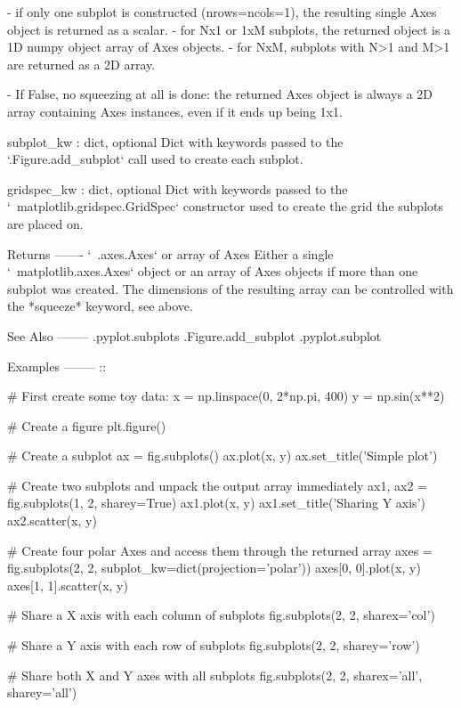 \begin{DoxyVerb}
\begin{DoxyVerb}
\begin{DoxyVerb}
      - if only one subplot is constructed (nrows=ncols=1), the
resulting single Axes object is returned as a scalar.
      - for Nx1 or 1xM subplots, the returned object is a 1D numpy
object array of Axes objects.
      - for NxM, subplots with N>1 and M>1 are returned as a 2D array.

    - If False, no squeezing at all is done: the returned Axes object
      is always a 2D array containing Axes instances, even if it ends
      up being 1x1.

subplot_kw : dict, optional
    Dict with keywords passed to the `.Figure.add_subplot` call used to
    create each subplot.

gridspec_kw : dict, optional
    Dict with keywords passed to the
    `~matplotlib.gridspec.GridSpec` constructor used to create
    the grid the subplots are placed on.

Returns
-------
`~.axes.Axes` or array of Axes
    Either a single `~matplotlib.axes.Axes` object or an array of Axes
    objects if more than one subplot was created. The dimensions of the
    resulting array can be controlled with the *squeeze* keyword, see
    above.

See Also
--------
.pyplot.subplots
.Figure.add_subplot
.pyplot.subplot

Examples
--------
::

    # First create some toy data:
    x = np.linspace(0, 2*np.pi, 400)
    y = np.sin(x**2)

    # Create a figure
    plt.figure()

    # Create a subplot
    ax = fig.subplots()
    ax.plot(x, y)
    ax.set_title('Simple plot')

    # Create two subplots and unpack the output array immediately
    ax1, ax2 = fig.subplots(1, 2, sharey=True)
    ax1.plot(x, y)
    ax1.set_title('Sharing Y axis')
    ax2.scatter(x, y)

    # Create four polar Axes and access them through the returned array
    axes = fig.subplots(2, 2, subplot_kw=dict(projection='polar'))
    axes[0, 0].plot(x, y)
    axes[1, 1].scatter(x, y)

    # Share a X axis with each column of subplots
    fig.subplots(2, 2, sharex='col')

    # Share a Y axis with each row of subplots
    fig.subplots(2, 2, sharey='row')

    # Share both X and Y axes with all subplots
    fig.subplots(2, 2, sharex='all', sharey='all')


\end{DoxyVerb}
\end{DoxyVerb}
\end{DoxyVerb}
